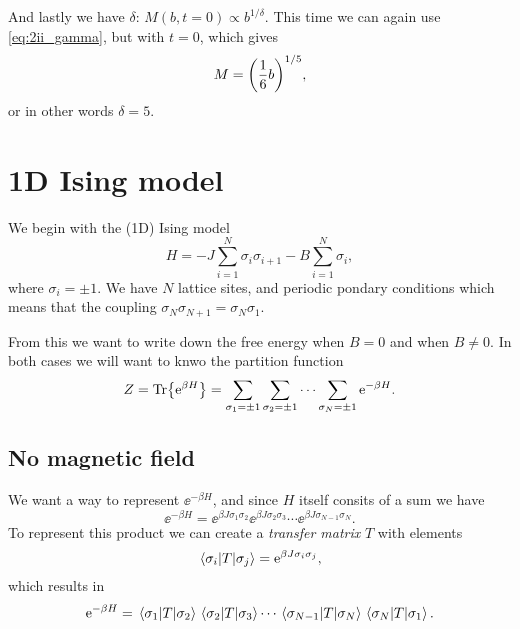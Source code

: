 \documentclass[11pt,letter, swedish, english
]{article}
\begin{document}
And lastly we have $\delta$: $M(b,t=0)\propto b^{1/\delta}$. This time
we can again use \eqref{eq:2ii_gamma}, but with $t=0$, which gives
\begin{equation}
M=\qty(\frac{1}{6}b)^{1/5},
\end{equation}
or in other words $\delta=5$.



\section{1D Ising model}
We begin with the (1D) Ising model
\begin{equation}\label{eq:3_H}
H=-J\sum_{i=1}^{N}\sigma_{i}\sigma_{i+1}-B\sum_{i=1}^N\sigma_i,
\end{equation}
where $\sigma_i=\pm1$. We have $N$ lattice sites, and periodic pondary
conditions which means that the coupling
$\sigma_N\sigma_{N+1}=\sigma_N\sigma_1$. 

From this we want to write down the free
energy when $B=0$ and when $B\neq0$. In both cases we will want to
knwo the partition function
\begin{equation}\label{eq:3_Z}
Z=\Tr{\mathrm{e}^{\beta H}}
=\sum_{\sigma_1=\pm1}\sum_{\sigma_2=\pm1}\cdots\sum_{\sigma_N=\pm1}\mathrm{e}^{-\beta H}.
\end{equation}

\subsection{No magnetic field}
We want a way to represent $\ee^{-\beta H}$, and since $H$ itself
consits of a sum we have
\begin{equation}
\ee^{-\beta H}=
\ee^{\beta J\sigma_1\sigma_2}\ee^{\beta J\sigma_2\sigma_3}
\cdots\ee^{\beta J\sigma_{N-1}\sigma_N}.
\end{equation}
To represent this product we can create a \emph{transfer matrix}
$T$ with elements
\begin{equation}\label{eq:3_T_sigma}
\mel{\sigma_i}{T}{\sigma_j}=\mathrm{e}^{\beta J\sigma_i\sigma_j},
\end{equation}
which results in
\begin{equation}\label{eq:3_e^H_mel}
\mathrm{e}^{-\beta H}=\mel{\sigma_1}{T}{\sigma_2}\mel{\sigma_2}{T}{\sigma_3}
\cdots\mel{\sigma_{N-1}}{T}{\sigma_N}\mel{\sigma_{N}}{T}{\sigma_1}.
\end{equation}
\end{document}
